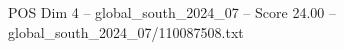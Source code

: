 \begin{textsample}{POS Dim 4 – global\_south\_2024\_07 – Score 24.00 – global\_south\_2024\_07/110087508.txt}
\end{textsample}
